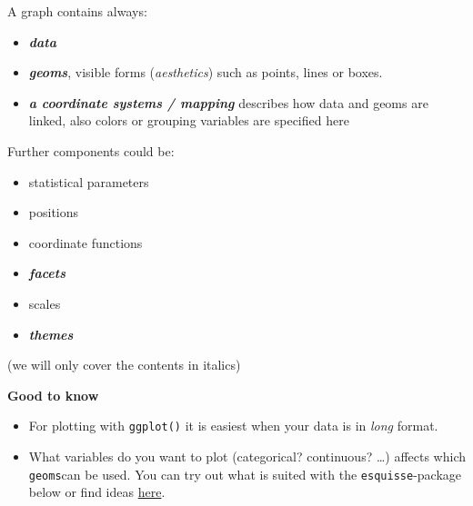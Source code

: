 \documentclass[
  letterpaper,
  DIV=11,
  numbers=noendperiod,
  oneside]{scrreprt}
\begin{document}
A graph contains always:

\begin{itemize}
\item
  \textbf{\emph{data}}
\item
  \textbf{\emph{geoms}}, visible forms (\emph{aesthetics}) such as
  points, lines or boxes.
\item
  \textbf{\emph{a coordinate systems / mapping}} describes how data and
  geoms are linked, also colors or grouping variables are specified here
\end{itemize}

Further components could be:

\begin{itemize}
\item
  statistical parameters
\item
  positions
\item
  coordinate functions
\item
  \textbf{\emph{facets}}
\item
  scales
\item
  \textbf{\emph{themes}}
\end{itemize}

(we will only cover the contents in italics)

\begin{tcolorbox}[enhanced jigsaw, arc=.35mm, left=2mm, breakable, toprule=.15mm, opacityback=0, colframe=quarto-callout-tip-color-frame, colback=white, rightrule=.15mm, bottomrule=.15mm, leftrule=.75mm]
\begin{minipage}[t]{5.5mm}
\textcolor{quarto-callout-tip-color}{\faLightbulb}
\end{minipage}%
\begin{minipage}[t]{\textwidth - 5.5mm}

\textbf{Good to know}\vspace{2mm}

\begin{itemize}
\item
  For plotting with \texttt{ggplot()} it is easiest when your data is in
  \emph{long} format.
\item
  What variables do you want to plot (categorical? continuous? \ldots)
  affects which \texttt{geoms}can be used. You can try out what is
  suited with the \texttt{esquisse}-package below or find ideas
  \href{https://www.data-to-viz.com}{here}.
\end{itemize}

\end{minipage}%
\end{tcolorbox}
\end{document}
